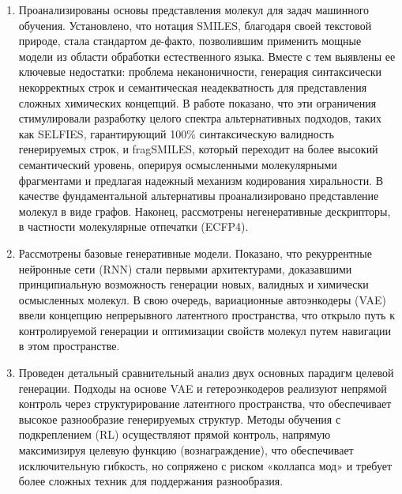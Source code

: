 \documentclass[../main.tex]{subfiles}
\begin{document}
\begin{enumerate}
    \item Проанализированы основы представления молекул для задач машинного обучения. Установлено, что нотация SMILES, благодаря своей текстовой природе, стала стандартом де-факто, позволившим применить мощные модели из области обработки естественного языка. Вместе с тем выявлены ее ключевые недостатки: проблема неканоничности, генерация синтаксически некорректных строк и семантическая неадекватность для представления сложных химических концепций. В работе показано, что эти ограничения стимулировали разработку целого спектра альтернативных подходов, таких как SELFIES, гарантирующий 100\% синтаксическую валидность генерируемых строк, и fragSMILES, который переходит на более высокий семантический уровень, оперируя осмысленными молекулярными фрагментами и предлагая надежный механизм кодирования хиральности. В качестве фундаментальной альтернативы проанализировано представление молекул в виде графов. Наконец, рассмотрены негенеративные дескрипторы, в частности молекулярные отпечатки (ECFP4).

    \item Рассмотрены базовые генеративные модели. Показано, что рекуррентные нейронные сети (RNN) стали первыми архитектурами, доказавшими принципиальную возможность генерации новых, валидных и химически осмысленных молекул. В свою очередь, вариационные автоэнкодеры (VAE) ввели концепцию непрерывного латентного пространства, что открыло путь к контролируемой генерации и оптимизации свойств молекул путем навигации в этом пространстве.

    \item Проведен детальный сравнительный анализ двух основных парадигм целевой генерации. Подходы на основе VAE и гетероэнкодеров реализуют непрямой контроль через структурирование латентного пространства, что обеспечивает высокое разнообразие генерируемых структур. Методы обучения с подкреплением (RL) осуществляют прямой контроль, напрямую максимизируя целевую функцию (вознаграждение), что обеспечивает исключительную гибкость, но сопряжено с риском «коллапса мод» и требует более сложных техник для поддержания разнообразия.


\end{enumerate}
\end{document}
